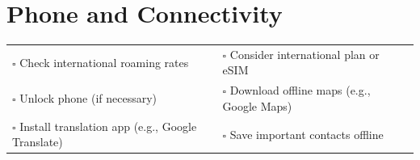 
\section{Phone and Connectivity}
\label{sec:phone}

\begin{tabular}{p{9cm} p{8cm}}
$\square$ Check international roaming rates & $\square$ Consider international plan or eSIM \\ 
$\square$ Unlock phone (if necessary) & $\square$ Download offline maps (e.g., Google Maps) \\ 
$\square$ Install translation app (e.g., Google Translate) & $\square$ Save important contacts offline \\ 
\end{tabular}

